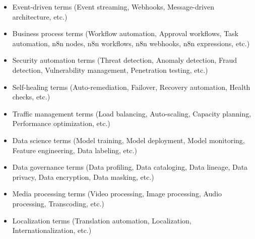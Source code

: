 \documentclass[11pt,a4paper]{article}
\begin{document}
\begin{itemize}
\item Event-driven terms (Event streaming, Webhooks, Message-driven architecture, etc.)
\end{itemize}

\begin{itemize}
\item Business process terms (Workflow automation, Approval workflows, Task automation, n8n nodes, n8n workflows, n8n webhooks, n8n expressions, etc.)
\end{itemize}

\begin{itemize}
\item Security automation terms (Threat detection, Anomaly detection, Fraud detection, Vulnerability management, Penetration testing, etc.)
\end{itemize}

\begin{itemize}
\item Self-healing terms (Auto-remediation, Failover, Recovery automation, Health checks, etc.)
\end{itemize}

\begin{itemize}
\item Traffic management terms (Load balancing, Auto-scaling, Capacity planning, Performance optimization, etc.)
\end{itemize}

\begin{itemize}
\item Data science terms (Model training, Model deployment, Model monitoring, Feature engineering, Data labeling, etc.)
\end{itemize}

\begin{itemize}
\item Data governance terms (Data profiling, Data cataloging, Data lineage, Data privacy, Data encryption, Data masking, etc.)
\end{itemize}

\begin{itemize}
\item Media processing terms (Video processing, Image processing, Audio processing, Transcoding, etc.)
\end{itemize}

\begin{itemize}
\item Localization terms (Translation automation, Localization, Internationalization, etc.)
\end{itemize}
\end{document}
